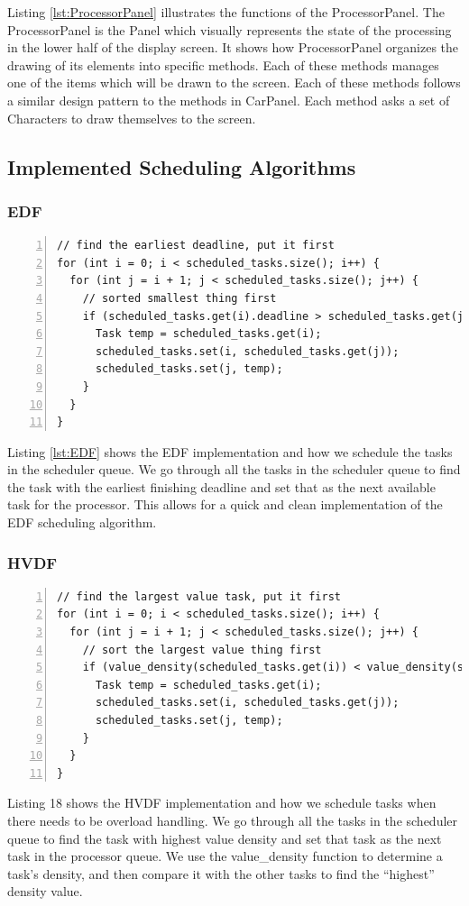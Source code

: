 \documentclass{article} %
\begin{document}
Listing \ref{lst:ProcessorPanel} illustrates the functions of the ProcessorPanel.
The ProcessorPanel is the Panel which visually represents the state of the processing in the lower half of the display screen.
It shows how ProcessorPanel organizes the drawing of its elements into specific methods.
Each of these methods manages one of the items which will be drawn to the screen.
Each of these methods follows a similar design pattern to the methods in CarPanel.
Each method asks a set of Characters to draw themselves to the screen.

\subsection{Implemented Scheduling Algorithms}
\subsubsection{EDF}
\begin{lstlisting}[caption={EDF scheduler implementation},label={lst:EDF},numbers=left]
// find the earliest deadline, put it first
for (int i = 0; i < scheduled_tasks.size(); i++) {
  for (int j = i + 1; j < scheduled_tasks.size(); j++) {
    // sorted smallest thing first
    if (scheduled_tasks.get(i).deadline > scheduled_tasks.get(j).deadline) {
      Task temp = scheduled_tasks.get(i);
      scheduled_tasks.set(i, scheduled_tasks.get(j));
      scheduled_tasks.set(j, temp);
    }
  }
}
\end{lstlisting}
Listing \ref{lst:EDF} shows the EDF implementation and how we schedule the tasks in the 
scheduler queue.  We go through all the tasks in the scheduler queue to find the task 
with the earliest finishing deadline and set that as the next available task for the 
processor.  This allows for a quick and clean implementation of the EDF scheduling 
algorithm.

\subsubsection{HVDF}
\begin{lstlisting}[caption={HVDF scheduler implementation},label={lst:ProcessorPanel},numbers=left]
// find the largest value task, put it first
for (int i = 0; i < scheduled_tasks.size(); i++) {
  for (int j = i + 1; j < scheduled_tasks.size(); j++) {
    // sort the largest value thing first
    if (value_density(scheduled_tasks.get(i)) < value_density(scheduled_tasks.get(j))) {
      Task temp = scheduled_tasks.get(i);
      scheduled_tasks.set(i, scheduled_tasks.get(j));
      scheduled_tasks.set(j, temp);
    }
  }
}
\end{lstlisting}
Listing 18 shows the HVDF implementation and how we schedule tasks when there 
needs to be overload handling.  We go through all the tasks in the scheduler queue 
to find the task with highest value density and set that task as the next task in the 
processor queue.  We use the value_density function to determine a task’s density, 
and then compare it with the other tasks to find the “highest” density value.
\end{document}
